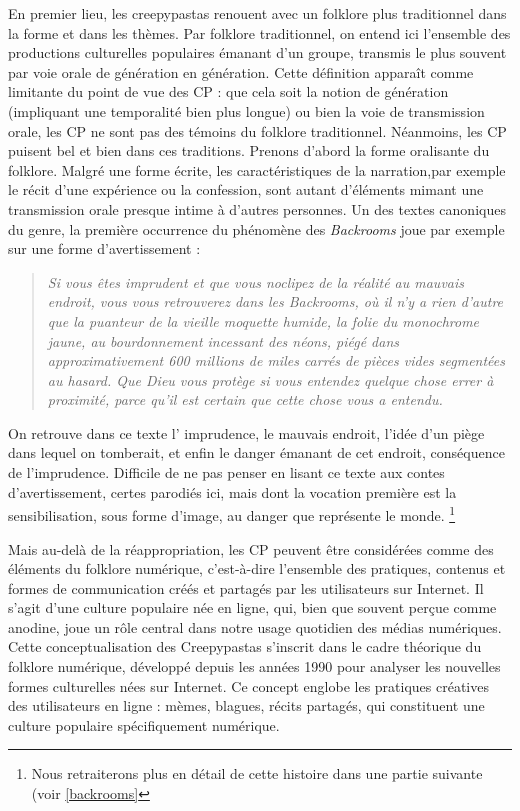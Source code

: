 \documentclass[12pt,a4paper,oneside,titlepage]{book} %
\begin{document}
En premier lieu, les creepypastas renouent avec un folklore plus traditionnel dans la forme et dans les thèmes. Par folklore traditionnel, on entend ici l'ensemble des productions culturelles populaires émanant d'un groupe, transmis le plus souvent par voie orale de génération en génération. 
Cette définition apparaît comme limitante du point de vue des CP : que cela soit la notion de génération (impliquant une temporalité bien plus longue) ou bien la voie de transmission orale, les CP ne sont pas des témoins du folklore traditionnel. 
Néanmoins, les CP puisent bel et bien dans ces traditions. Prenons d'abord la forme oralisante du folklore. Malgré une forme écrite, les caractéristiques de la narration,par exemple le récit d'une expérience ou la confession, sont autant d'éléments mimant une transmission orale presque intime à d'autres personnes.
Un des textes canoniques du genre, la première occurrence du phénomène des \textit{Backrooms} joue par exemple sur une forme d'avertissement : 
\par
\begin{quotation}
\textit{Si vous êtes imprudent et que vous \textit{noclipez} de la réalité au mauvais endroit, vous vous retrouverez dans les \textit{Backrooms}, où il n'y a rien d'autre que la puanteur de la vieille moquette humide, la folie du monochrome jaune, au bourdonnement incessant des néons, piégé dans approximativement 600 millions de miles carrés de pièces vides segmentées au hasard. Que Dieu vous protège si vous entendez quelque chose errer à proximité, parce qu’il est certain que cette chose vous a entendu.}
\end{quotation} \label{txt:backrooms}

On retrouve dans ce texte l' \og imprudence\fg{}, le mauvais endroit, l'idée d'un piège dans lequel on tomberait, et enfin le danger émanant de cet endroit, conséquence de l'imprudence. 
Difficile de ne pas penser en lisant ce texte aux contes d'avertissement, certes parodiés ici, mais dont la vocation première est la sensibilisation, sous forme d'image, au danger que représente le monde. \footnote{Nous retraiterons plus en détail de cette histoire dans une partie suivante (voir \ref{backrooms} }

Mais au-delà de la réappropriation, les CP peuvent être considérées comme des éléments du folklore numérique, c'est-à-dire l'ensemble des pratiques, contenus et formes de communication créés et partagés par les utilisateurs sur Internet. Il s’agit d’une culture populaire née en ligne, qui, bien que souvent perçue comme anodine, joue un rôle central dans notre usage quotidien des médias numériques.
Cette conceptualisation des Creepypastas s'inscrit dans le cadre théorique du folklore numérique, développé depuis les années 1990 pour analyser les nouvelles formes culturelles nées sur Internet. Ce concept englobe les pratiques créatives des utilisateurs en ligne : mèmes, blagues, récits partagés, qui constituent une culture populaire spécifiquement numérique.
\end{document}
